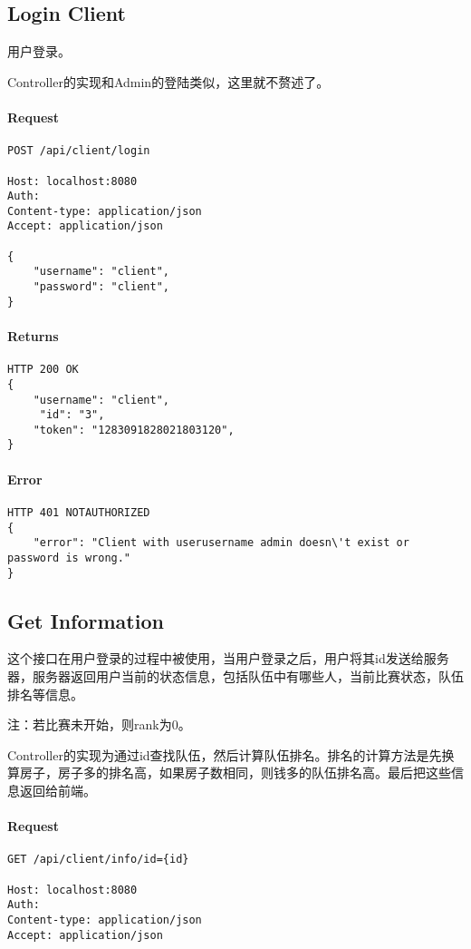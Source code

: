 \documentclass{article}
\begin{document}
\subsection{Login Client}
用户登录。

Controller的实现和Admin的登陆类似，这里就不赘述了。

\paragraph*{Request}
\begin{lstlisting}
POST /api/client/login

Host: localhost:8080
Auth:
Content-type: application/json
Accept: application/json

{
    "username": "client",
    "password": "client",
}
\end{lstlisting}

\paragraph*{Returns}
\begin{lstlisting}
HTTP 200 OK
{
    "username": "client",
     "id": "3",
    "token": "1283091828021803120",
}

\end{lstlisting}

\paragraph*{Error}
\begin{lstlisting}
HTTP 401 NOTAUTHORIZED
{
    "error": "Client with userusername admin doesn\'t exist or password is wrong."
}
\end{lstlisting}

\subsection{Get Information}
这个接口在用户登录的过程中被使用，当用户登录之后，用户将其id发送给服务器，服务器返回用户当前的状态信息，包括队伍中有哪些人，当前比赛状态，队伍排名等信息。

注：若比赛未开始，则rank为0。

Controller的实现为通过id查找队伍，然后计算队伍排名。排名的计算方法是先换算房子，房子多的排名高，如果房子数相同，则钱多的队伍排名高。最后把这些信息返回给前端。

				\paragraph*{Request}
\begin{lstlisting}
GET /api/client/info/id={id}

Host: localhost:8080
Auth:
Content-type: application/json
Accept: application/json
\end{lstlisting}
\end{document}
